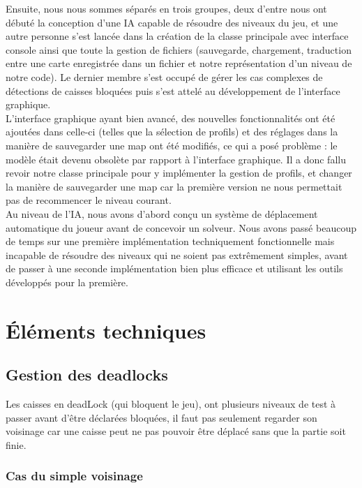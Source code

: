 \documentclass[a4paper,12pt]{article} %
\begin{document}
Ensuite, nous nous sommes séparés en trois groupes, deux d'entre nous ont débuté la conception d'une IA capable de résoudre des niveaux du jeu, et une autre personne s'est lancée dans la création de la classe principale avec interface console ainsi que toute la gestion de fichiers (sauvegarde, chargement, traduction entre une carte enregistrée dans un fichier et notre représentation d'un niveau de notre code). Le dernier membre s'est occupé de gérer les cas complexes de détections de caisses bloquées puis s'est attelé au développement de l'interface graphique.\\

L'interface graphique ayant bien avancé, des nouvelles fonctionnalités ont été ajoutées dans celle-ci (telles que la sélection de profils) et des réglages dans la manière de sauvegarder une map ont été modifiés, ce qui a posé problème : le modèle était devenu obsolète par rapport à l'interface graphique. Il a donc fallu revoir notre classe principale pour y implémenter la gestion de profils, et changer la manière de sauvegarder une map car la première version ne nous permettait pas de recommencer le niveau courant.\\

Au niveau de l'IA, nous avons d'abord conçu un système de déplacement automatique du joueur avant de concevoir un solveur. Nous avons passé beaucoup de temps sur une première implémentation techniquement fonctionnelle mais incapable de résoudre des niveaux qui ne soient pas extrêmement simples, avant de passer à une seconde implémentation bien plus efficace et utilisant les outils développés pour la première. 

\section{Éléments techniques}\label{et}

\subsection{Gestion des deadlocks}

Les caisses en deadLock (qui bloquent le jeu), ont plusieurs niveaux de test à passer avant d'être déclarées bloquées, il faut pas seulement regarder son voisinage car une caisse peut ne pas pouvoir être déplacé sans que la partie soit finie.

\subsubsection{Cas du simple voisinage}
\end{document}
